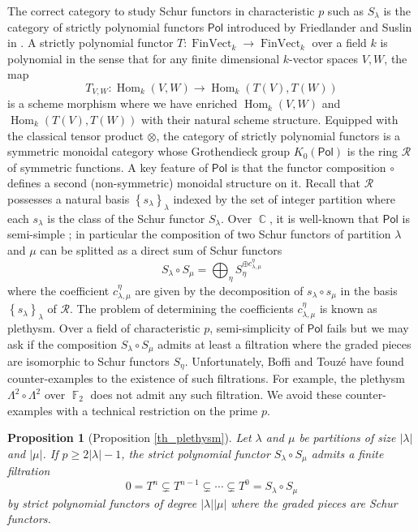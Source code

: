 \documentclass[11pt]{amsart}
\numberwithin{subsection}{section}
\numberwithin{figure}{section}
\numberwithin{table}{section}
\theoremstyle{1}
\newtheorem*{proposition*}{Proposition}
\theoremstyle{2}
\DeclareMathOperator{\F}{\mathbb{F}}
\DeclareMathOperator{\C}{\mathbb{C}}
\DeclareMathOperator{\FinVect}{FinVect}
\DeclareMathOperator{\Hom}{Hom}
\begin{document}
The correct category to study Schur functors in characteristic $p$ such as $S_{\lambda}$ is the category of strictly polynomial functors $\textsf{Pol}$ introduced by Friedlander and Suslin in \cite{MR1427618}. A strictly polynomial functor $T : \FinVect_{k} \rightarrow \FinVect_{k}$ over a field $k$ is polynomial in the sense that for any finite dimensional $k$-vector spaces $V,W$, the map
\begin{equation*}
T_{V,W} : \Hom_k(V,W) \rightarrow \Hom_k(T(V),T(W))
\end{equation*}
is a scheme morphism where we have enriched $\Hom_k(V,W)$ and $\Hom_k(T(V),T(W))$ with their natural scheme structure. Equipped with the classical tensor product $\otimes$, the category of strictly polynomial functors is a symmetric monoidal category whose Grothendieck group $K_0(\textsf{Pol})$ is the ring $\mathcal{R}$ of symmetric functions. A key feature of $\textsf{Pol}$ is that the functor composition $\circ$ defines a second (non-symmetric) monoidal structure on it. Recall that $\mathcal{R}$ possesses a natural basis $\left\{s_{\lambda}\right\}_{\lambda}$ indexed by the set of integer partition where each $s_{\lambda}$ is the class of the Schur functor $S_{\lambda}$. Over $\C$, it is well-known that $\textsf{Pol}$ is semi-simple ; in particular the composition of two Schur functors of partition $\lambda$ and $\mu$ can be splitted as a direct sum of Schur functors 
\begin{equation*}
S_{\lambda} \circ S_{\mu} = \bigoplus_{\eta} S_{\eta}^{\oplus c^{\eta}_{\lambda,\mu}}
\end{equation*}
where the coefficient $c^{\eta}_{\lambda,\mu}$ are given by the decomposition of $s_{\lambda}\circ s_{\mu}$ in the basis $\left\{s_{\lambda}\right\}_{\lambda}$ of $\mathcal{R}$. The problem of determining the coefficients $c^{\eta}_{\lambda,\mu}$ is known as plethysm. Over a field of characteristic $p$, semi-simplicity of $\textsf{Pol}$ fails but we may ask if the composition $S_\lambda \circ S_{\mu}$ admits at least a filtration where the graded pieces are isomorphic to Schur functors $S_{\eta}$. Unfortunately, Boffi \cite{MR1128609} and Touzé \cite[Corollary 6.10.]{MR3042627} have found counter-examples to the existence of such filtrations. For example, the plethysm $\Lambda^2 \circ \Lambda^2$ over $\F_2$ does not admit any such filtration. We avoid these counter-examples with a technical restriction on the prime $p$.
\begin{proposition*}[Proposition \ref{th_plethysm}]
Let $\lambda$ and $\mu$ be partitions of size $|\lambda|$ and $|\mu|$. If $p \geq 2|\lambda |-1$, the strict polynomial functor $S_{\lambda} \circ S_{\mu}$ admits a finite filtration
\begin{equation*}
0 =T^n \subsetneq T^{n-1} \subsetneq
 \cdots \subsetneq
 T^0 = S_{\lambda} \circ S_{\mu}
\end{equation*}
by strict polynomial functors of degree $|\lambda| |\mu |$ where the graded pieces are Schur functors.
\end{proposition*}
\end{document}
